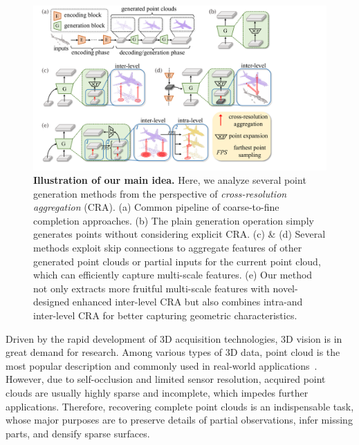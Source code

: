 \documentclass[letterpaper]{article} %
\begin{document}
\begin{figure}[t]
\centering
\includegraphics[width=1.0\linewidth]{Figures/intro.pdf}
\caption{
{\bf Illustration of our main idea.}
Here, we analyze several point generation methods from the perspective of {\em cross-resolution aggregation} (CRA).
(a) Common pipeline of coarse-to-fine completion approaches.
(b) The plain generation operation simply generates points without considering explicit CRA.
(c) \& (d) Several methods exploit skip connections to aggregate features of other generated point clouds or partial inputs for the current point cloud, which can efficiently  capture multi-scale features.
(e) Our method not only extracts more fruitful multi-scale features with novel-designed enhanced inter-level CRA but also combines intra-and inter-level CRA for better capturing geometric characteristics.}
\label{fig:intro}
\end{figure}

Driven by the  rapid development of 3D  acquisition technologies, 3D vision is in great demand for research.
Among various types of 3D data, point cloud is the most  popular description and commonly used in real-world applications~\cite{cadena2016past, reddy2018carfusion, rusu2008towards}.
However, due to self-occlusion and limited sensor resolution, acquired point clouds are usually highly sparse and incomplete, which impedes further applications.
Therefore, recovering complete point clouds is an indispensable task, whose major purposes are to preserve details of partial observations, infer missing parts, and densify sparse surfaces.
\end{document}
